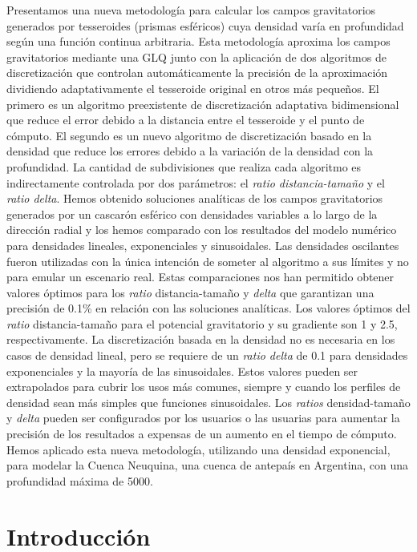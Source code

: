 Presentamos una nueva metodología para calcular los campos gravitatorios
generados por tesseroides (prismas esféricos) cuya densidad varía en
profundidad según una función continua arbitraria.
Esta metodología aproxima los campos gravitatorios mediante una \ac{GLQ} junto
con la aplicación de dos algoritmos de discretización que controlan
automáticamente la precisión de la aproximación dividiendo adaptativamente el
tesseroide original en otros más pequeños.
El primero es un algoritmo preexistente de discretización adaptativa
bidimensional que reduce el error debido a la distancia entre el tesseroide
y el punto de cómputo.
El segundo es un nuevo algoritmo de discretización basado en la densidad que
reduce los errores debido a la variación de la densidad con la profundidad.
La cantidad de subdivisiones que realiza cada algoritmo es indirectamente
controlada por dos parámetros: el \emph{ratio distancia-tamaño} y el
\emph{ratio delta}.
Hemos obtenido soluciones analíticas de los campos gravitatorios generados por
un cascarón esférico con densidades variables a lo largo de la dirección radial
y los hemos comparado con los resultados del modelo numérico para densidades
lineales, exponenciales y sinusoidales.
Las densidades oscilantes fueron utilizadas con la única intención de someter
al algoritmo a sus límites y no para emular un escenario real.
Estas comparaciones nos han permitido obtener valores óptimos para los
\emph{ratio} distancia-tamaño y \emph{delta} que garantizan una precisión de
0.1\% en relación con las soluciones analíticas.
Los valores óptimos del \emph{ratio} distancia-tamaño para el potencial
gravitatorio y su gradiente son 1 y 2.5, respectivamente.
La discretización basada en la densidad no es necesaria en los casos de
densidad lineal, pero se requiere de un \emph{ratio delta} de 0.1 para
densidades exponenciales y la mayoría de las sinusoidales.
Estos valores pueden ser extrapolados para cubrir los usos más comunes, siempre
y cuando los perfiles de densidad sean más simples que funciones sinusoidales.
Los \emph{ratios} densidad-tamaño y \emph{delta} pueden ser configurados
por los usuarios o las usuarias para aumentar la precisión de los resultados
a expensas de un aumento en el tiempo de cómputo.
Hemos aplicado esta nueva metodología, utilizando una densidad exponencial,
para modelar la Cuenca Neuquina, una cuenca de antepaís en Argentina, con una
profundidad máxima de 5000\m{}.


\section{Introducción}

